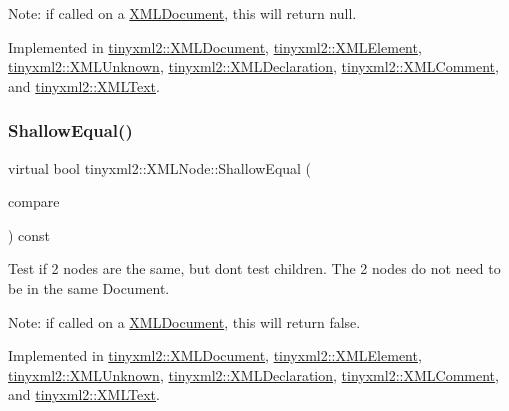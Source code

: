 Note\+: if called on a \mbox{\hyperlink{classtinyxml2_1_1XMLDocument}{X\+M\+L\+Document}}, this will return null. 

Implemented in \mbox{\hyperlink{classtinyxml2_1_1XMLDocument_aa37cc1709d7e1e988bc17dcfb24a69b8}{tinyxml2\+::\+X\+M\+L\+Document}}, \mbox{\hyperlink{classtinyxml2_1_1XMLElement_ac035742d68b0c50c3f676374e59fe750}{tinyxml2\+::\+X\+M\+L\+Element}}, \mbox{\hyperlink{classtinyxml2_1_1XMLUnknown_a0125f41c89763dea06619b5fd5246b4c}{tinyxml2\+::\+X\+M\+L\+Unknown}}, \mbox{\hyperlink{classtinyxml2_1_1XMLDeclaration_a118d47518dd9e522644e42efa259aed7}{tinyxml2\+::\+X\+M\+L\+Declaration}}, \mbox{\hyperlink{classtinyxml2_1_1XMLComment_a08991cc63fadf7e95078ac4f9ea1b073}{tinyxml2\+::\+X\+M\+L\+Comment}}, and \mbox{\hyperlink{classtinyxml2_1_1XMLText_af3a81ed4dd49d5151c477b3f265a3011}{tinyxml2\+::\+X\+M\+L\+Text}}.

\mbox{\label{classtinyxml2_1_1XMLNode_a7ce18b751c3ea09eac292dca264f9226}} 
\subsubsection{\texorpdfstring{ShallowEqual()}{ShallowEqual()}}
{\footnotesize\ttfamily virtual bool tinyxml2\+::\+X\+M\+L\+Node\+::\+Shallow\+Equal (\begin{DoxyParamCaption}\item[{const \mbox{\hyperlink{classtinyxml2_1_1XMLNode}{X\+M\+L\+Node}} $\ast$}]{compare }\end{DoxyParamCaption}) const\hspace{0.3cm}{\ttfamily [pure virtual]}}

Test if 2 nodes are the same, but don\textquotesingle{}t test children. The 2 nodes do not need to be in the same Document.

Note\+: if called on a \mbox{\hyperlink{classtinyxml2_1_1XMLDocument}{X\+M\+L\+Document}}, this will return false. 

Implemented in \mbox{\hyperlink{classtinyxml2_1_1XMLDocument_a6fe5ef18699091844fcf64b56ffa5bf9}{tinyxml2\+::\+X\+M\+L\+Document}}, \mbox{\hyperlink{classtinyxml2_1_1XMLElement_ad9ea913a460b48979bd83cf9871c99f6}{tinyxml2\+::\+X\+M\+L\+Element}}, \mbox{\hyperlink{classtinyxml2_1_1XMLUnknown_a0715ab2c05d7f74845c188122213b116}{tinyxml2\+::\+X\+M\+L\+Unknown}}, \mbox{\hyperlink{classtinyxml2_1_1XMLDeclaration_aa26b70011694e9b9e9480b929e9b78d6}{tinyxml2\+::\+X\+M\+L\+Declaration}}, \mbox{\hyperlink{classtinyxml2_1_1XMLComment_a6f7d227b25afa8cc3c763b7cc8833739}{tinyxml2\+::\+X\+M\+L\+Comment}}, and \mbox{\hyperlink{classtinyxml2_1_1XMLText_ae0fff8a24e2de7eb073fd192e9db0331}{tinyxml2\+::\+X\+M\+L\+Text}}.

